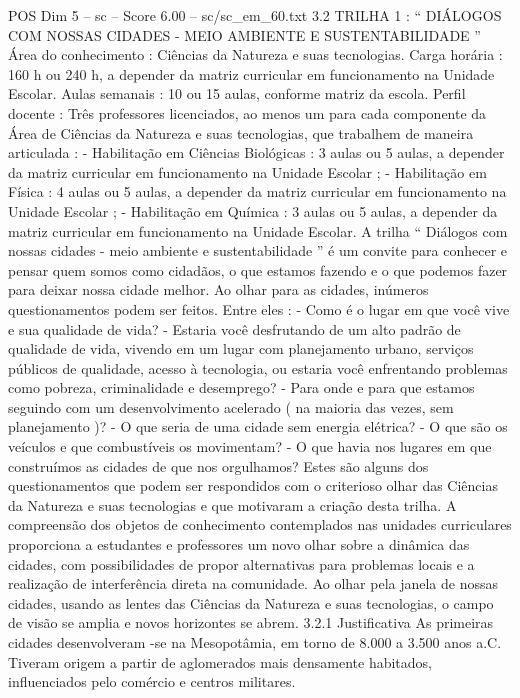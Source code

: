 \begin{textsample}{POS Dim 5 – sc – Score 6.00 – sc/sc\_em\_60.txt}  \label{ex:f5_pos_040}
3.2 TRILHA 1 : “ DIÁLOGOS COM NOSSAS CIDADES - MEIO AMBIENTE E SUSTENTABILIDADE ” Área do conhecimento : Ciências da Natureza e suas tecnologias.
Carga horária : 160 h ou 240 h, a depender da matriz curricular em funcionamento na Unidade Escolar.
Aulas semanais : 10 ou 15 aulas, conforme matriz da escola.
Perfil docente : Três professores licenciados, ao menos um para cada componente da Área de Ciências da Natureza e suas tecnologias, que trabalhem de maneira articulada : - Habilitação em Ciências Biológicas : 3 aulas ou 5 aulas, a depender da matriz curricular em funcionamento na Unidade Escolar ; - Habilitação em Física : 4 aulas ou 5 aulas, a depender da matriz curricular em funcionamento na Unidade Escolar ; - Habilitação em Química : 3 aulas ou 5 aulas, a depender da matriz curricular em funcionamento na Unidade Escolar.
A trilha “ Diálogos com nossas cidades - meio ambiente e sustentabilidade ” é um convite para conhecer e pensar quem somos como cidadãos, o que estamos fazendo e o que podemos fazer para deixar nossa cidade melhor.
Ao olhar para as cidades, inúmeros questionamentos podem ser feitos.
Entre eles : - Como é o lugar em que você vive e sua qualidade de vida? - Estaria você desfrutando de um alto padrão de qualidade de vida, vivendo em um lugar com planejamento urbano, serviços públicos de qualidade, acesso à tecnologia, ou estaria você enfrentando problemas como pobreza, criminalidade e desemprego? - Para onde e para que estamos seguindo com um desenvolvimento acelerado ( na maioria das vezes, sem planejamento )? - O que seria de uma cidade sem energia elétrica? - O que são os veículos e que combustíveis os movimentam? - O que havia nos lugares em que construímos as cidades de que nos orgulhamos?
Estes são alguns dos questionamentos que podem ser respondidos com o criterioso olhar das Ciências da Natureza e suas tecnologias e que motivaram a criação desta trilha.
A compreensão dos objetos de conhecimento contemplados nas unidades curriculares proporciona a estudantes e professores um novo olhar sobre a dinâmica das cidades, com possibilidades de propor alternativas para problemas locais e a realização de interferência direta na comunidade.
Ao olhar pela janela de nossas cidades, usando as lentes das Ciências da Natureza e suas tecnologias, o campo de visão se amplia e novos horizontes se abrem. 3.2.1 Justificativa As primeiras cidades desenvolveram -se na Mesopotâmia, em torno de 8.000 a 3.500 anos a.C.
Tiveram origem a partir de aglomerados mais densamente habitados, influenciados pelo comércio e centros militares.

\end{textsample}
